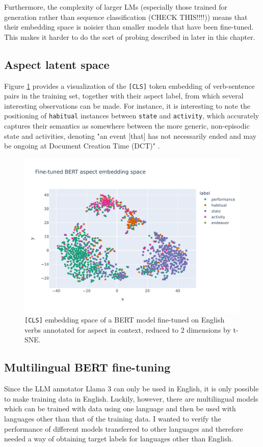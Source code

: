 Furthermore, the complexity of larger LMs (especially those trained for generation rather than sequence classification (CHECK THIS!!!!)) means that their embedding space is noisier than smaller models that have been fine-tuned. This makes it harder to do the sort of probing described in later in this chapter.


\subsection{Aspect latent space}
Figure \ref{fig:fine-tuned_aspect_latent_space} provides a visualization of the \texttt{[CLS]} token embedding of verb-sentence pairs in the training set, together with their aspect label, from which several interesting observations can be made. For instance, it is interesting to note the positioning of \texttt{habitual} instances between \texttt{state} and \texttt{activity}, which accurately captures their semantics as somewhere between the more generic, non-episodic state and activities, denoting "an event [that] has not necessarily ended and may be ongoing at Document Creation Time (DCT)" \citep{umr}.

\begin{figure}
    \includegraphics[width=\textwidth]{img/aspect_latent_space.jpeg}
    \caption{\texttt{[CLS]} embedding space of a BERT model fine-tuned on English verbs annotated for aspect in context, reduced to 2 dimensions by t-SNE.}
    \label{fig:fine-tuned_aspect_latent_space}
\end{figure}


\subsection{Multilingual BERT fine-tuning}
Since the LLM annotator Llama 3 can only be used in English, it is only possible to make training data in English. Luckily, however, there are multilingual models which can be trained with data using one language and then be used with languages other than that of the training data. I wanted to verify the performance of different models transferred to other languages and therefore needed a way of obtaining target labels for languages other than English.

